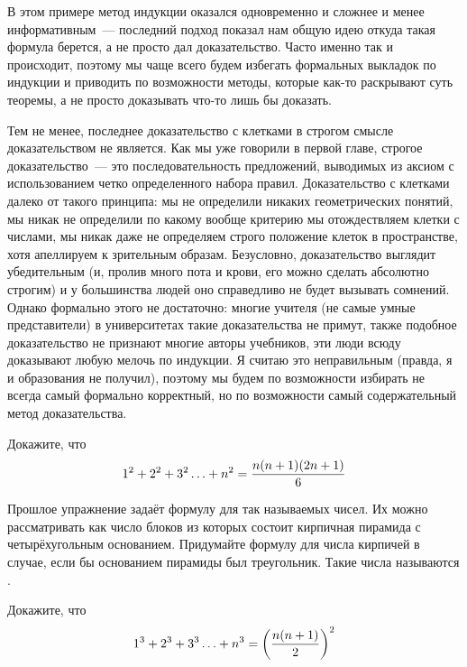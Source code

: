 В этом примере метод индукции оказался одновременно и сложнее и менее информативным~— последний подход показал нам общую идею откуда такая формула берется, а не просто дал доказательство. Часто именно так и происходит, поэтому мы чаще всего будем избегать формальных выкладок по индукции и приводить по возможности методы, которые как-то раскрывают суть теоремы, а не просто доказывать что-то лишь бы доказать.

Тем не менее, последнее доказательство с клетками в строгом смысле доказательством не является. Как мы уже говорили в первой главе, строгое доказательство~— это последовательность предложений, выводимых из аксиом с использованием четко определенного набора правил. Доказательство с клетками далеко от такого принципа: мы не определили никаких геометрических понятий, мы никак не определили по какому вообще критерию мы отождествляем клетки с числами, мы никак даже не определяем строго положение клеток в пространстве, хотя апеллируем к зрительным образам. Безусловно, доказательство выглядит убедительным (и, пролив много пота и крови, его можно сделать абсолютно строгим) и у большинства людей оно справедливо не будет вызывать сомнений. Однако формально этого не достаточно: многие учителя (не самые умные представители) в университетах такие доказательства не примут, также подобное доказательство не признают многие авторы учебников, эти люди всюду доказывают любую мелочь по индукции. Я считаю это неправильным (правда, я и образования не получил), поэтому мы будем по возможности избирать не всегда самый формально корректный, но по возможности самый содержательный метод доказательства.

\begin{exercise}
Докажите, что
$$1^2 + 2^2 +3^2 \ldots + n^2 = {n(n+1)(2n+1)\over 6}$$
\end{exercise}

\begin{exercise}
Прошлое упражнение задаёт формулу для так называемых  чисел. Их можно рассматривать как число блоков из которых состоит кирпичная пирамида с четырёхугольным основанием. Придумайте формулу для числа кирпичей в случае, если бы основанием пирамиды был треугольник. Такие числа называются .
\end{exercise}

\begin{exercise}
Докажите, что
$$1^3 + 2^3 +3^3 \ldots + n^3 = \left({n(n+1)\over 2}\right)^2$$
\end{exercise}


